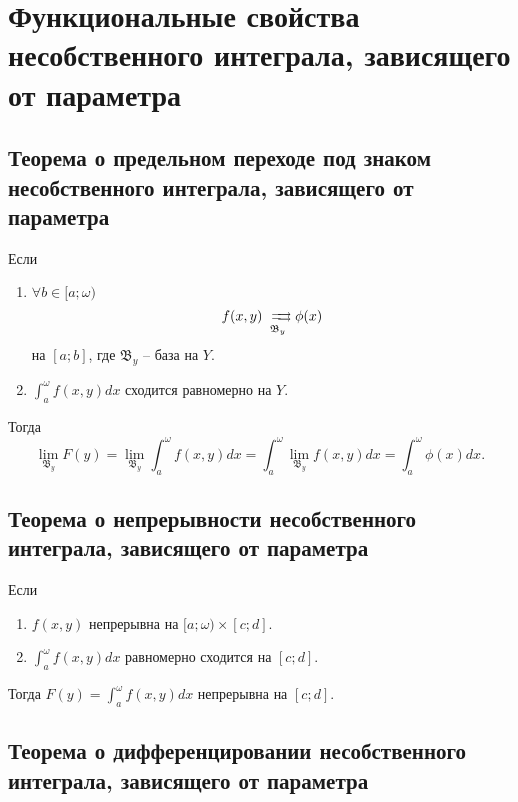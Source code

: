 \section{Функциональные свойства несобственного интеграла, зависящего от параметра}

\setcounter{subsection}{115}

\subsection{Теорема о предельном переходе под знаком несобственного интеграла, зависящего от параметра}

\begin{theorem}\label{theorem:7.3.1}
    Если
    \begin{enumerate}
        \item $\forall b \in [a;\omega)$
              \[
                  f(x,y) \xrightrightarrows[\mathfrak{B}_y]{}\phi(x)
              \]
              на $[a;b]$, где $\mathfrak{B}_y$ -- база на $Y$.
        \item $\int_{a}^{\omega}f(x,y)dx$ сходится равномерно на $Y$.
    \end{enumerate}
    Тогда \[
        \underset{\mathfrak{B}_y}{\lim} F(y) = \underset{\mathfrak{B}_y}{\lim} \int_{a}^{\omega}f(x,y)dx = \int_{a}^{\omega}\underset{\mathfrak{B}_y}{\lim} f(x,y)dx = \int_{a}^{\omega}\phi(x)dx.
    \]
\end{theorem}

\subsection{Теорема о непрерывности несобственного интеграла, зависящего от параметра}

\begin{corollary}
    Если \begin{enumerate}
        \item $f(x,y)$ непрерывна на $[a;\omega)\times[c;d]$.
        \item $\int_{a}^{\omega}f(x,y)dx$ равномерно сходится на $[c;d]$.
    \end{enumerate}

    Тогда $F(y) = \int_{a}^{\omega}f(x,y)dx$ непрерывна на $[c;d]$.
\end{corollary}

\subsection{Теорема о дифференцировании несобственного интеграла, зависящего от параметра}

